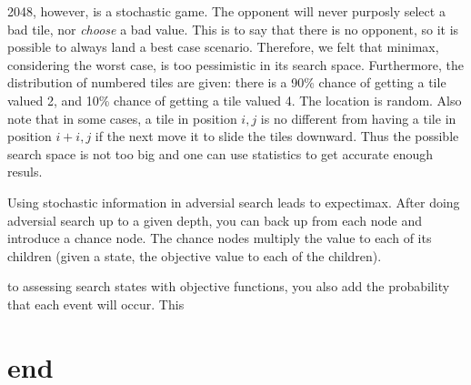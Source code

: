 \documentclass[journal]{IEEEtran}
\begin{document}

2048, however, is a stochastic game. The opponent will never purposly select a
bad tile, nor \textit{choose} a bad value. This is to say that there is no opponent,
so it is possible to always land a best case scenario. Therefore, we felt that minimax,
considering the worst case, is too pessimistic in its search space.
Furthermore, the distribution of numbered tiles are given:
there is a 90\% chance of getting a tile valued 2, and 10\% chance of getting a tile
valued 4. The location is random. Also note that in some cases, a tile
in position $i,j$  is no different from having a tile in position $i+i,j$ if the
next move it to slide the tiles downward. Thus the possible search space
is not too big and one can use statistics to get accurate enough resuls.


Using stochastic information in adversial search leads to expectimax. 
After doing adversial search up to a given depth, you can back up from each node
and introduce a chance node. The chance nodes multiply the value to each
of its children (given a state, the objective value to each of the children).



to assessing search states with objective functions, you also add the probability
that each event will occur. This




\section*{end}
\end{document}
